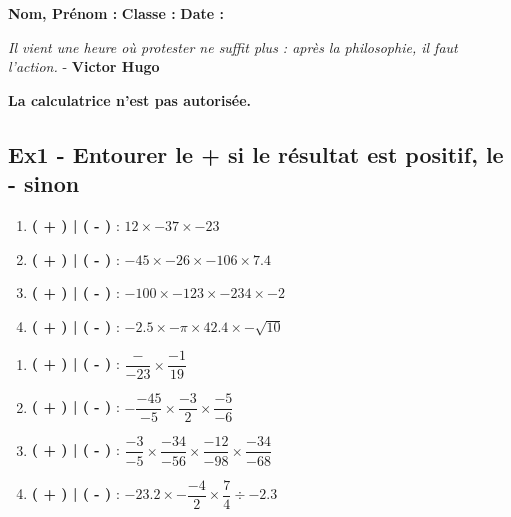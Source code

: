 \documentclass[12pt]{article}
\begin{document}

\textbf{Nom, Prénom :} \hspace{8cm} \textbf{Classe :} \hspace{3cm} \textbf{Date :}

\begin{center}
  \textit{Il vient une heure où protester ne suffit plus : après la philosophie, il faut l’action.}  - \textbf{Victor Hugo}

\end{center}

\textbf{La calculatrice n'est pas autorisée.}

\subsection*{Ex1 - Entourer le + si le résultat est positif, le - sinon}

\begin{multicols}{2}
  
  \begin{enumerate}
  \item[] \textbf{( + ) | ( - )} : $ 12 \times -37 \times -23$\\
  \item[] \textbf{( + ) | ( - )} : $ -45 \times -26 \times -106 \times 7.4$\\
  \item[] \textbf{( + ) | ( - )} : $ -100 \times -123 \times -234 \times -2$\\
  \item[] \textbf{( + ) | ( - )} : $ -2.5 \times -\pi \times 42.4 \times -\sqrt{10}$\\
  \end{enumerate}

  \begin{enumerate}
  \item[] \textbf{( + ) | ( - )} :  $ \dfrac{-}{-23} \times \dfrac{-1}{19} $ \\
  \item[] \textbf{( + ) | ( - )} :  $ - \dfrac{-45}{-5} \times \dfrac{-3}{2} \times \dfrac{-5}{-6}$ \\
  \item[] \textbf{( + ) | ( - )} :  $ \dfrac{-3}{-5} \times \dfrac{-34}{-56} \times \dfrac{-12}{-98} \times  \dfrac{-34}{-68} $ \\
  \item[] \textbf{( + ) | ( - )} :  $ -23.2 \times -\dfrac{-4}{2} \times \dfrac{7}{4} \div -2.3$ \\
  \end{enumerate}

\end{multicols}
\end{document}
